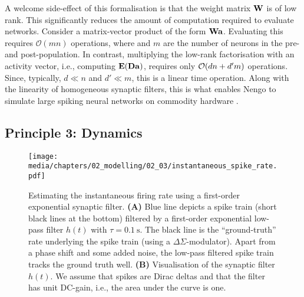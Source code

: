 
A welcome side-effect of this formalisation is that the weight matrix $\mathbf{W}$ is of low rank.
This significantly reduces the amount of computation required to evaluate \NEF networks.
Consider a matrix-vector product of the form $\mathbf{W} \mathbf{a}$.
Evaluating this requires $\mathcal{O}(mn)$ operations, where \Npop and $m$ are the number of neurons in the pre- and post-population.
In contrast, multiplying the low-rank factorisation with an activity vector, i.e., computing $\mathbf{E} ( \mathbf{D} \mathbf{a} 
)$, requires only $\mathcal{O}(d n + d' m)$ operations.
Since, typically, $d \ll n$ and $d' \ll m$, this is a linear time operation.
Along with the linearity of homogeneous synaptic filters, this is what enables Nengo to simulate large spiking neural networks on commodity hardware \citep{bekolay2014nengo}.

\subsection{Principle 3: Dynamics}
\label{sec:nef_dynamics}


\begin{figure}
	\centering
	\texttt{[image: media/chapters/02\_modelling/02\_03/instantaneous\_spike\_rate.pdf]}%
	{\label{fig:instantaneous_spike_rate_a}}%
	{\label{fig:first_order_low_pass}}%
	\caption[Estimating the instantaneous firing rate using a synaptic filter]{Estimating the instantaneous firing rate using a first-order exponential synaptic filter. \textbf{(A)} Blue line depicts a spike train (short black lines at the bottom) filtered by a first-order exponential low-pass filter $h(t)$ with $\tau = \SI{0.1}{\second}$. The black line is the \enquote{ground-truth} rate underlying the spike train (using a $\Delta\Sigma$-modulator).
	Apart from a phase shift and some added noise, the low-pass filtered spike train tracks the ground truth well.
	\textbf{(B)} Visualisation of the synaptic filter $h(t)$. We assume that spikes are Dirac deltas and that the filter has unit DC-gain, i.e., the area under the curve is one.}
	\label{fig:instantaneous_spike_rate}
\end{figure}

